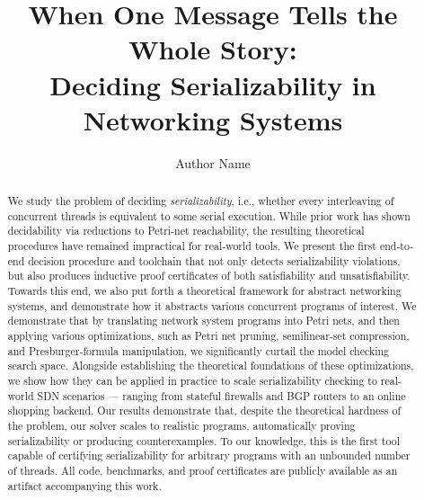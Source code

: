 \documentclass[acmsmall,review,anonymous,nonacm]{acmart}
\title{When One Message Tells the Whole Story:\\ Deciding Serializability in Networking Systems}
\author{Author Name}
\affiliation{
  \institution{Institution Name}
  \city{City}
  \state{State}
  \country{Country}
}
\let\oldmaketitle\maketitle
\renewcommand{\maketitle}{
  \oldmaketitle
  \pagestyle{plain}  %
  \thispagestyle{plain}  %
}
\begin{document}
\begin{abstract}
	We study the problem of deciding \textit{serializability}, i.e., whether every interleaving of concurrent threads is equivalent to some serial execution. While prior work has shown decidability via reductions to Petri‐net reachability, the resulting theoretical procedures have remained impractical for real‐world tools. We present the first end‐to‐end decision procedure and toolchain that not only detects serializability violations, but also produces inductive proof certificates of both satisfiability and unsatisfiability. Towards this end, we also put forth a theoretical framework for abstract networking systems, and demonstrate how it abstracts various concurrent programs of interest. 
	We demonstrate that by translating network system programs into Petri nets, and then applying various optimizations, such as Petri net pruning, semilinear‐set compression, and Presburger‐formula manipulation, we significantly curtail the model checking search space. 
	Alongside establishing the theoretical foundations of these optimizations, we show how they can be applied in practice to scale serializability checking to real-world SDN scenarios --- ranging from stateful firewalls and BGP routers to an online shopping backend.
	Our results demonstrate that, despite the theoretical hardness of the problem, our solver scales to realistic programs, automatically proving serializability or producing counterexamples. To our knowledge, this is the first tool capable of certifying serializability for arbitrary programs with an unbounded number of threads. All code, benchmarks, and proof certificates are publicly available as an artifact accompanying this work.
\end{abstract}

%	

\maketitle












\newpage




\newpage







\end{document}
